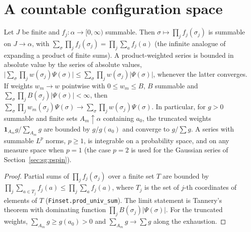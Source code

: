\section{A countable configuration space}\label{sec:sg:countable}

\begin{lemma}\label{lem:sg:tannery}
  \leanok
Let $J$ be finite and $f_j:\alpha\to[0,\infty)$ summable. Then $\sigma\mapsto\prod_jf_j(\sigma_j)$ is summable on $J\to\alpha$, with $\sum_\sigma\prod_jf_j(\sigma_j)=\prod_j\sum_af_j(a)$ (the infinite analogue of expanding a product of finite sums). A product-weighted series is bounded in absolute value by the series of absolute values, $\big|\sum_\sigma\prod_jw(\sigma_j)\Psi(\sigma)\big|\le\sum_\sigma\prod_jw(\sigma_j)|\Psi(\sigma)|$, whenever the latter converges. If
weights $w_m\to w$ pointwise with $0\le w_m\le B$, $B$ summable and $\sum_\sigma\prod_jB(\sigma_j)|\Psi(\sigma)|<\infty$, then
$\sum_\sigma\prod_jw_m(\sigma_j)\Psi(\sigma)\to\sum_\sigma\prod_jw(\sigma_j)\Psi(\sigma)$. In particular, for $g>0$ summable and finite
sets $A_m\uparrow\alpha$ containing $a_0$, the truncated weights $\mathbf 1_{A_m}g/\sum_{A_m}g$ are bounded by $g/g(a_0)$ and converge to $g/\sum g$. A series with
summable $L^p$ norms, $p\ge1$, is integrable on a probability space, and on any measure space when $p=1$ (the case $p=2$ is used for the Gaussian series of Section~\ref{sec:sg:pspin}).
\end{lemma}

\begin{proof}
  \leanok
Partial sums of $\prod_jf_j(\sigma_j)$ over a finite set $T$ are bounded by $\prod_j\sum_{a\in T_j}f_j(a)\le\prod_j\sum_af_j(a)$, where $T_j$ is
the set of $j$-th coordinates of elements of $T$ (\texttt{Finset.prod\_univ\_sum}). The limit statement is Tannery's theorem with dominating function
$\prod_jB(\sigma_j)|\Psi(\sigma)|$. For the truncated weights, $\sum_{A_m}g\ge g(a_0)>0$ and $\sum_{A_m}g\to\sum g$ along the exhaustion.
\end{proof}

